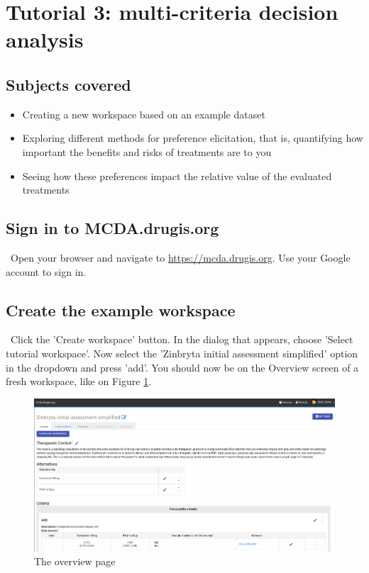 \documentclass[00_mcda_tutorial.tex]{subfiles}
\begin{document}
\section*{Tutorial 3: multi-criteria decision analysis}
\addtocounter{section}{1}

\subsection*{Subjects covered}
\begin{itemize}
\item Creating a new workspace based on an example dataset
\item Exploring different methods for preference elicitation, that is, quantifying how important the benefits and risks of treatments are to you
\item Seeing how these preferences impact the relative value of the evaluated treatments
\end{itemize}

\subsection*{Sign in to MCDA.drugis.org}
\leftpointright \, Open your browser and navigate to \href{https://mcda.drugis.org}{https://mcda.drugis.org}. Use your Google account to sign in.

\subsection*{Create the example workspace}
\leftpointright \, Click the 'Create workspace' button. In the dialog that appears, choose 'Select tutorial workspace'. Now select the 'Zinbryta initial assessment simplified' option in the dropdown and press 'add'. You should now be on the Overview screen of a fresh workspace, like on Figure \ref{fig:overview_page}.
\newline

\begin{figure}[!h]
    \centering
	\includegraphics[width=\textwidth]{fig/overviewPage.png}
    \caption{The overview page}
	\label{fig:overview_page}
\end{figure}
\end{document}
